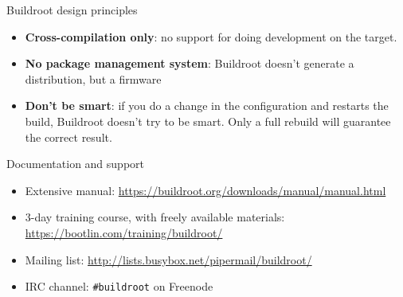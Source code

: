 \documentclass[aspectratio=169,obeyspaces,spaces,hyphens,dvipsnames]{beamer}
\begin{document}
\begin{frame}{Buildroot design principles}

  \begin{itemize}

  \item {\bf Cross-compilation only}: no support for doing development
    on the target.

  \item {\bf No package management system}: Buildroot doesn't generate
    a distribution, but a firmware

  \item {\bf Don't be smart}: if you do a change in the configuration
    and restarts the build, Buildroot doesn't try to be smart. Only a
    full rebuild will guarantee the correct result.

  \end{itemize}

\end{frame}

\begin{frame}{Documentation and support}
  \begin{itemize}
  \item Extensive manual:
    \url{https://buildroot.org/downloads/manual/manual.html}
  \item 3-day training course, with freely available materials:
    \url{https://bootlin.com/training/buildroot/}
  \item Mailing list:
    \url{http://lists.busybox.net/pipermail/buildroot/}
  \item IRC channel: \texttt{\#buildroot} on Freenode
  \end{itemize}
\end{frame}
\end{document}
